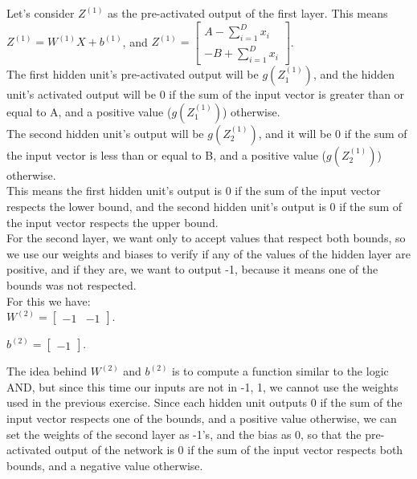 \documentclass{article}
\begin{document}
Let's consider $Z^{(1)}$ as the pre-activated output of the first layer. This means $Z^{(1)} = W^{(1)}X + b^{(1)}$, and
$Z^{(1)} = \begin{bmatrix}
    A -\sum_{i=1}^{D} x_i\\
    -B + \sum_{i=1}^{D} x_i
\end{bmatrix}
$. \\

The first hidden unit's pre-activated output will be $g(Z_1^{(1)})$, and the hidden unit's activated output 
will be 0 if the sum of the input vector is greater than or equal to A, and a positive value ($g(Z_1^{(1)})$) otherwise. \\
The second hidden unit's output will be $g(Z_2^{(1)})$, and it will be 0 if the sum of the input vector is less than or equal to B, 
and a positive value ($g(Z_2^{(1)})$) otherwise. \\
This means the first hidden unit's output is 0 if the sum of the input vector respects the lower bound, 
and the second hidden unit's output is 0 if the sum of the input vector respects the upper bound. \\

For the second layer, we want only to accept values that respect both bounds, so we use our weights and biases to verify if any of the values
of the hidden layer are positive, and if they are, we want to output -1, because it means one of the bounds was not respected. \\

For this we have: \\

\( W^{(2)} = \begin{bmatrix}
    -1 & -1
\end{bmatrix}
\).

\(b^{(2)} = \begin{bmatrix}
    -1
\end{bmatrix}
\).

The idea behind \(W^{(2)}\) and \(b^{(2)}\) is to compute a function similar to the logic AND, but since this time our inputs are not in 
{-1, 1}, we cannot use the weights used in the previous exercise.
Since each hidden unit outputs 0 if the sum of the input vector respects one of the bounds, and a positive value otherwise, we can set the 
weights of the second layer as -1's, and the bias as 0, so that the pre-activated output of the network is 0 if the sum of the input vector 
respects both bounds, and a negative value otherwise. \\
\end{document}
